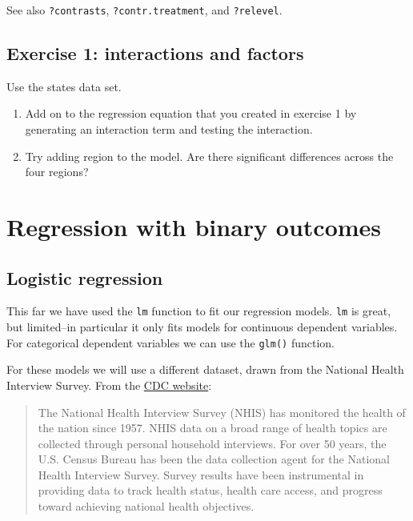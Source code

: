 \documentclass[]{book}
\begin{document}
See also \texttt{?contrasts}, \texttt{?contr.treatment}, and
\texttt{?relevel}.

\subsection{Exercise 1: interactions and
factors}\label{exercise-1-interactions-and-factors}

Use the states data set.

\begin{enumerate}
\def\labelenumi{\arabic{enumi}.}
\item
  Add on to the regression equation that you created in exercise 1 by
  generating an interaction term and testing the interaction.
\item
  Try adding region to the model. Are there significant differences
  across the four regions?
\end{enumerate}

\section{Regression with binary
outcomes}\label{regression-with-binary-outcomes}

\subsection{Logistic regression}\label{logistic-regression}

This far we have used the \texttt{lm} function to fit our regression
models. \texttt{lm} is great, but limited--in particular it only fits
models for continuous dependent variables. For categorical dependent
variables we can use the \texttt{glm()} function.

For these models we will use a different dataset, drawn from the
National Health Interview Survey. From the
\href{http://www.cdc.gov/nchs/nhis.htm}{CDC website}:

\begin{quote}
The National Health Interview Survey (NHIS) has monitored the health of
the nation since 1957. NHIS data on a broad range of health topics are
collected through personal household interviews. For over 50 years, the
U.S. Census Bureau has been the data collection agent for the National
Health Interview Survey. Survey results have been instrumental in
providing data to track health status, health care access, and progress
toward achieving national health objectives.
\end{quote}
\end{document}
